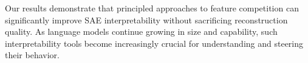 \documentclass{article} %
\begin{document}
Our results demonstrate that principled approaches to feature competition can significantly improve SAE interpretability without sacrificing reconstruction quality. As language models continue growing in size and capability, such interpretability tools become increasingly crucial for understanding and steering their behavior.



\end{document}
